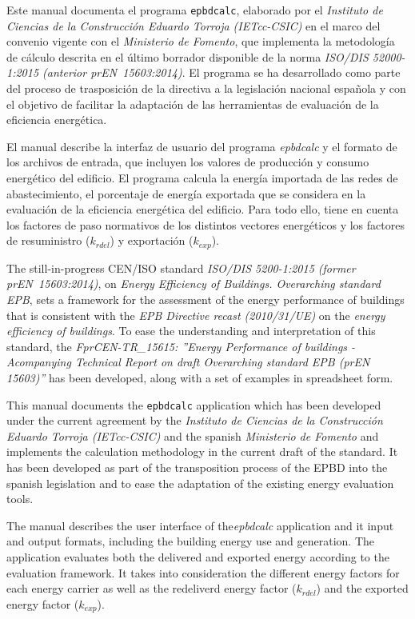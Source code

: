 \documentclass[10pt,notitlepage,oneside,a4paper]{article}
\begin{document}
Este manual documenta el programa \texttt{epbdcalc}, elaborado por el \textit{Instituto de Ciencias de la Construcción Eduardo Torroja (IETcc-CSIC)} en el marco del convenio vigente con el \textit{Ministerio de Fomento}, que implementa la metodología de cálculo descrita en el último borrador disponible de la norma \textit{ISO/DIS 52000-1:2015 (anterior prEN~15603:2014)}. El programa se ha desarrollado como parte del proceso de trasposición de la directiva a la legislación nacional española y con el objetivo de facilitar la adaptación de las herramientas de evaluación de la eficiencia energética.

El manual describe la interfaz de usuario del programa \textit{epbdcalc} y el formato de los archivos de entrada, que incluyen los valores de producción y consumo energético del edificio.
El programa calcula la energía importada de las redes de abastecimiento, el porcentaje de energía exportada que se considera en la evaluación de la eficiencia energética del edificio. Para todo ello, tiene en cuenta los factores de paso normativos de los distintos vectores energéticos y los factores de resuministro ($k_{rdel}$) y exportación ($k_{exp}$).

\begin{myquote}\footnotesize
    The still-in-progress CEN/ISO standard \textit{ISO/DIS 5200-1:2015 (former prEN~15603:2014)}, on \textit{Energy Efficiency of Buildings. Overarching standard EPB}, sets a framework for the assessment of the energy performance of buildings that is consistent with the \textit{EPB Directive recast (2010/31/UE)} on the \textit{energy efficiency of buildings}. To ease the understanding and interpretation of this standard, the \textit{FprCEN-TR\_15615: ''Energy Performance of buildings - Acompanying Technical Report on draft Overarching standard EPB (prEN 15603)''} has been developed, along with a set of examples in spreadsheet form.

This manual documents the \texttt{epbdcalc} application which has been developed under the current agreement by the \textit{Instituto de Ciencias de la Construcción Eduardo Torroja (IETcc-CSIC)} and the spanish \textit{Ministerio de Fomento} and implements the calculation methodology in the current draft of the standard. It has been developed as part of the transposition process of the EPBD into the spanish legislation and to ease the adaptation of the existing energy evaluation tools.

The manual describes the user interface of the\textit{epbdcalc} application and it input and output formats, including the building energy use and generation.
The application evaluates both the delivered and exported energy according to the evaluation framework. It takes into consideration the different energy factors for each energy carrier as well as the redeliverd energy factor ($k_{rdel}$) and the exported energy factor ($k_{exp}$).
\end{myquote}
\end{document}
